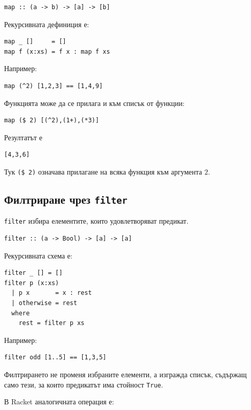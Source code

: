 \begin{verbatim}
map :: (a -> b) -> [a] -> [b]
\end{verbatim}

Рекурсивната дефиниция е:

\begin{verbatim}
map _ []     = []
map f (x:xs) = f x : map f xs
\end{verbatim}

Например:

\begin{verbatim}
map (^2) [1,2,3] == [1,4,9]
\end{verbatim}

Функцията може да се прилага и към списък от функции:

\begin{verbatim}
map ($ 2) [(^2),(1+),(*3)]
\end{verbatim}

Резултатът е

\begin{verbatim}
[4,3,6]
\end{verbatim}

Тук \texttt{(\$ 2)} означава прилагане на всяка функция към аргумента $2$.

\subsection{Филтриране чрез \texttt{filter}}\label{s:20.4.3}

\texttt{filter} избира елементите, които удовлетворяват предикат.

\begin{verbatim}
filter :: (a -> Bool) -> [a] -> [a]
\end{verbatim}

Рекурсивната схема е:

\begin{verbatim}
filter _ [] = []
filter p (x:xs)
  | p x       = x : rest
  | otherwise = rest
  where
    rest = filter p xs
\end{verbatim}

Например:

\begin{verbatim}
filter odd [1..5] == [1,3,5]
\end{verbatim}

Филтрирането не променя избраните елементи, а изгражда списък, съдържащ само тези, за които предикатът има стойност \texttt{True}.

В Racket аналогичната операция е:

